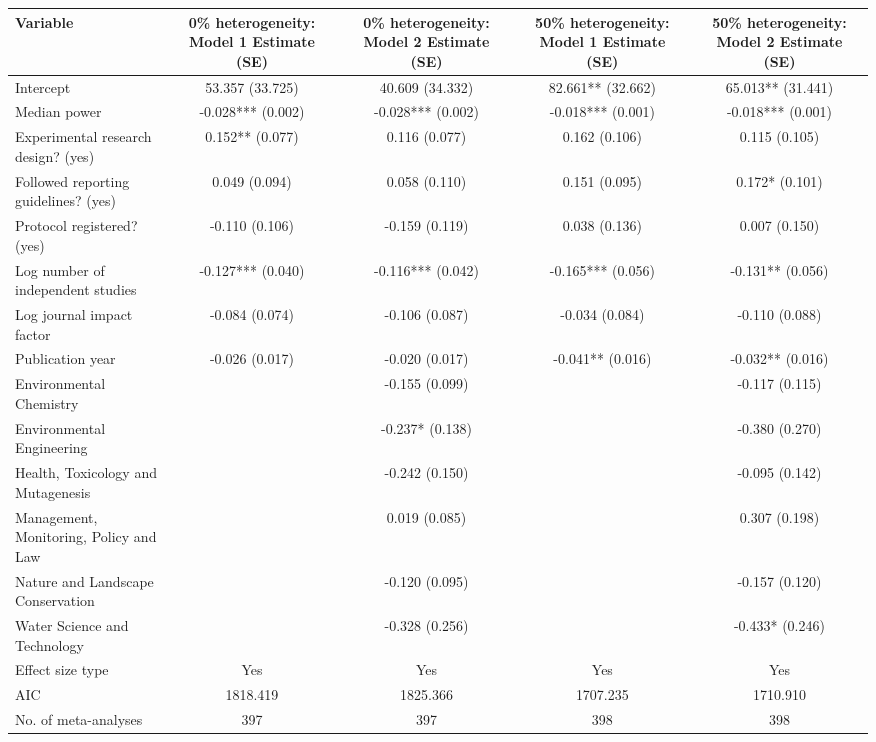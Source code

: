 \begin{tabular}{lcccc}
\hline
Variable & 0\% heterogeneity: Model 1 Estimate (SE) & 0\% heterogeneity: Model 2 Estimate (SE) & 50\% heterogeneity: Model 1 Estimate (SE) & 50\% heterogeneity: Model 2 Estimate (SE) \\
\hline
Intercept & 53.357 (33.725) & 40.609 (34.332) & 82.661** (32.662) & 65.013** (31.441) \\
Median power & -0.028*** (0.002) & -0.028*** (0.002) & -0.018*** (0.001) & -0.018*** (0.001) \\
Experimental research design? (yes) & 0.152** (0.077) & 0.116 (0.077) & 0.162 (0.106) & 0.115 (0.105) \\
Followed reporting guidelines? (yes) & 0.049 (0.094) & 0.058 (0.110) & 0.151 (0.095) & 0.172* (0.101) \\
Protocol registered? (yes) & -0.110 (0.106) & -0.159 (0.119) & 0.038 (0.136) & 0.007 (0.150) \\
Log number of independent studies & -0.127*** (0.040) & -0.116*** (0.042) & -0.165*** (0.056) & -0.131** (0.056) \\
Log journal impact factor & -0.084 (0.074) & -0.106 (0.087) & -0.034 (0.084) & -0.110 (0.088) \\
Publication year & -0.026 (0.017) & -0.020 (0.017) & -0.041** (0.016) & -0.032** (0.016) \\
Environmental Chemistry &  & -0.155 (0.099) &  & -0.117 (0.115) \\
Environmental Engineering &  & -0.237* (0.138) &  & -0.380 (0.270) \\
Health, Toxicology and Mutagenesis &  & -0.242 (0.150) &  & -0.095 (0.142) \\
Management, Monitoring, Policy and Law &  & 0.019 (0.085) &  & 0.307 (0.198) \\
Nature and Landscape Conservation &  & -0.120 (0.095) &  & -0.157 (0.120) \\
Water Science and Technology &  & -0.328 (0.256) &  & -0.433* (0.246) \\
Effect size type & Yes & Yes & Yes & Yes \\
AIC & 1818.419 & 1825.366 & 1707.235 & 1710.910 \\
No. of meta-analyses & 397 & 397 & 398 & 398 \\
\hline
\end{tabular}
